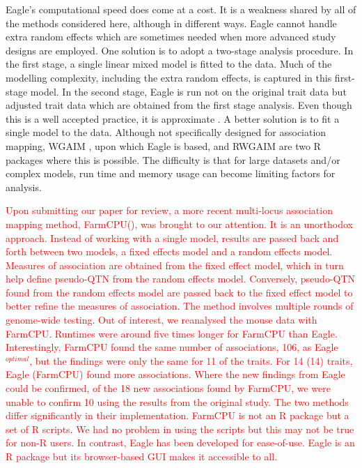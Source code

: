 \documentclass{article}
\begin{document}
Eagle's computational speed does come at a cost. It is a weakness shared by all of the methods considered here, although in different ways. 
Eagle cannot handle extra random effects which are sometimes needed when more advanced study designs are employed. One solution 
is to adopt a two-stage analysis procedure. In the first stage, a single linear mixed model is fitted to the data. Much of the modelling complexity, 
including the extra random effects, is 
captured in this first-stage model. In the second stage, Eagle is run not on the original trait data but adjusted trait data which are obtained from the first stage analysis. Even though this is a well accepted practice, it is approximate \citep{gogel2018comparison}.  A better solution is to fit a single model to the data. 
Although not specifically designed for association mapping,
WGAIM \citep{verbyla2007analysis}, upon which Eagle is based, and RWGAIM \citep{verbyla2012rwgaim}  are two R packages where this is possible. The difficulty is that for large datasets and/or complex 
models,  run time and memory usage can become limiting factors for analysis. 

\textcolor{red}{
Upon submitting our paper for review, a more recent multi-locus association mapping method, FarmCPU(), was brought to our attention. 
It is an unorthodox approach. Instead of working with a single model, results are passed back and forth between two models, 
a fixed effects model and a random effects model. Measures of association are obtained from the fixed effect model, which in turn 
help define pseudo-QTN from the random effects model. Conversely, pseudo-QTN found from the random effects model are passed 
back to the fixed effect model to better refine the measures of association.  The method involves multiple rounds of genome-wide 
testing. Out of interest, we reanalysed the mouse data with FarmCPU.  Runtimes were around five times longer for FarmCPU than 
Eagle.  Interestingly, FarmCPU found the same number of associations, 106,  as Eagle$^{optimal}$, but the findings were only the 
same for 11 of the traits.  For 14 (14) traits, Eagle (FarmCPU) found more associations.  Where the new findings from Eagle could 
be confirmed, of the 18 new associations found by FarmCPU, we were unable to confirm 10 using the results from the original study. 
The two methods differ significantly in their implementation. FarmCPU is not an R package but a set of R scripts. We had 
no problem in using the scripts but this may not be true for non-R users. In contrast, Eagle has been developed for ease-of-use.
Eagle is an R package but its browser-based GUI makes it accessible to all.
}
\end{document}

